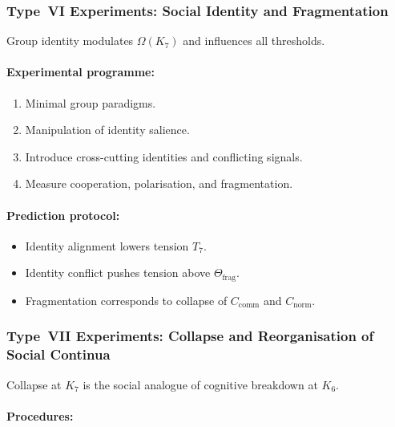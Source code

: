 \subsubsection{Type~VI Experiments: Social Identity and Fragmentation}

Group identity modulates $\Omega(K_7)$ and influences all thresholds.

\paragraph{Experimental programme:}

\begin{enumerate}
    \item Minimal group paradigms.
    \item Manipulation of identity salience.
    \item Introduce cross-cutting identities and conflicting signals.
    \item Measure cooperation, polarisation, and fragmentation.
\end{enumerate}

\paragraph{Prediction protocol:}

\begin{itemize}
    \item Identity alignment lowers tension $T_7$.
    \item Identity conflict pushes tension above $\Theta_{\mathrm{frag}}$.
    \item Fragmentation corresponds to collapse of 
          $C_{\mathrm{comm}}$ and $C_{\mathrm{norm}}$.
\end{itemize}



\subsubsection{Type~VII Experiments: Collapse and Reorganisation of Social Continua}

Collapse at $K_7$ is the social analogue of cognitive breakdown at $K_6$.

\paragraph{Procedures:}


